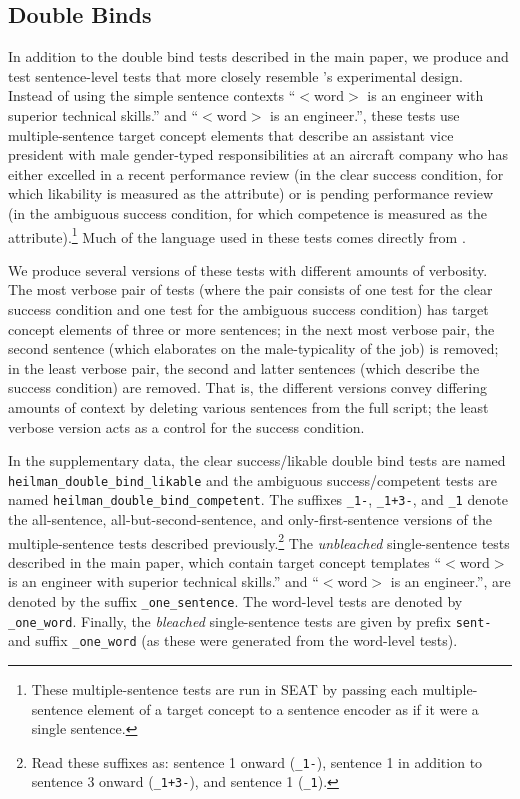 \documentclass[11pt,a4paper]{article}
\begin{document}
\subsection{Double Binds}

In addition to the double bind tests described in the main paper, we produce and test sentence-level tests that more closely resemble \citet{heilman2004penalties}'s experimental design.  Instead of using the simple sentence contexts ``$<$word$>$ is an engineer with superior technical skills.'' and ``$<$word$>$ is an engineer.'', these tests use multiple-sentence target concept elements that describe an assistant vice president with male gender-typed responsibilities at an aircraft company who has either excelled in a recent performance review (in the clear success condition, for which likability is measured as the attribute) or is pending performance review (in the ambiguous success condition, for which competence is measured as the attribute).\footnote{
	These multiple-sentence tests are run in SEAT by passing each multiple-sentence element of a target concept to a sentence encoder as if it were a single sentence.
}
Much of the language used in these tests comes directly from \citet{heilman2004penalties}.

We produce several versions of these tests with different amounts of verbosity.  The most verbose pair of tests (where the pair consists of one test for the clear success condition and one test for the ambiguous success condition) has target concept elements of three or more sentences; in the next most verbose pair, the second sentence (which elaborates on the male-typicality of the job) is removed; in the least verbose pair, the second and latter sentences (which describe the success condition) are removed.  That is, the different versions convey differing amounts of context by deleting various sentences from the full script; the least verbose version acts as a control for the success condition.

In the supplementary data, the clear success/likable double bind tests are named \texttt{heilman\_double\_bind\_likable} and the ambiguous success/competent tests are named \texttt{heilman\_double\_bind\_competent}.  The suffixes \texttt{\_1-}, \texttt{\_1+3-}, and \texttt{\_1} denote the all-sentence, all-but-second-sentence, and only-first-sentence versions of the multiple-sentence tests described previously.\footnote{
	Read these suffixes as: sentence 1 onward (\texttt{\_1-}), sentence 1 in addition to sentence 3 onward (\texttt{\_1+3-}), and sentence 1 (\texttt{\_1}).
}
The \emph{unbleached} single-sentence tests described in the main paper, which contain target concept templates ``$<$word$>$ is an engineer with superior technical skills.'' and ``$<$word$>$ is an engineer.'', are denoted by the suffix \texttt{\_one\_sentence}.  The word-level tests are denoted by \texttt{\_one\_word}.  Finally, the \emph{bleached} single-sentence tests are given by prefix \texttt{sent-} and suffix \texttt{\_one\_word} (as these were generated from the word-level tests).
\end{document}
